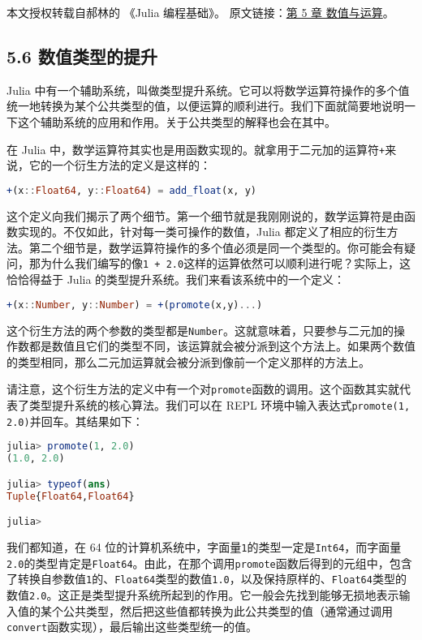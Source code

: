 
本文授权转载自郝林的 《Julia 编程基础》。 原文链接：\href{https://github.com/hyper0x/JuliaBasics/blob/master/book/ch05.md}{第 5 章 数值与运算}。


\subsection{5.6 数值类型的提升}

Julia 中有一个辅助系统，叫做类型提升系统。它可以将数学运算符操作的多个值统一地转换为某个公共类型的值，以便运算的顺利进行。我们下面就简要地说明一下这个辅助系统的应用和作用。关于公共类型的解释也会在其中。

在 Julia 中，数学运算符其实也是用函数实现的。就拿用于二元加的运算符\verb|+|来说，它的一个衍生方法的定义是这样的：
\begin{lstlisting}[language=julia]
+(x::Float64, y::Float64) = add_float(x, y)
\end{lstlisting}

这个定义向我们揭示了两个细节。第一个细节就是我刚刚说的，数学运算符是由函数实现的。不仅如此，针对每一类可操作的数值，Julia 都定义了相应的衍生方法。第二个细节是，数学运算符操作的多个值必须是同一个类型的。你可能会有疑问，那为什么我们编写的像\verb|1 + 2.0|这样的运算依然可以顺利进行呢？实际上，这恰恰得益于 Julia 的类型提升系统。我们来看该系统中的一个定义：
\begin{lstlisting}[language=julia]
+(x::Number, y::Number) = +(promote(x,y)...)
\end{lstlisting}

这个衍生方法的两个参数的类型都是\verb|Number|。这就意味着，只要参与二元加的操作数都是数值且它们的类型不同，该运算就会被分派到这个方法上。如果两个数值的类型相同，那么二元加运算就会被分派到像前一个定义那样的方法上。

请注意，这个衍生方法的定义中有一个对\verb|promote|函数的调用。这个函数其实就代表了类型提升系统的核心算法。我们可以在 REPL 环境中输入表达式\verb|promote(1, 2.0)|并回车。其结果如下：
\begin{lstlisting}[language=julia]
julia> promote(1, 2.0)
(1.0, 2.0)

julia> typeof(ans)
Tuple{Float64,Float64}

julia> 
\end{lstlisting}

我们都知道，在 64 位的计算机系统中，字面量\verb|1|的类型一定是\verb|Int64|，而字面量\verb|2.0|的类型肯定是\verb|Float64|。由此，在那个调用\verb|promote|函数后得到的元组中，包含了转换自参数值\verb|1|的、\verb|Float64|类型的数值\verb|1.0|，以及保持原样的、\verb|Float64|类型的数值\verb|2.0|。这正是类型提升系统所起到的作用。它一般会先找到能够无损地表示输入值的某个公共类型，然后把这些值都转换为此公共类型的值（通常通过调用\verb|convert|函数实现），最后输出这些类型统一的值。

